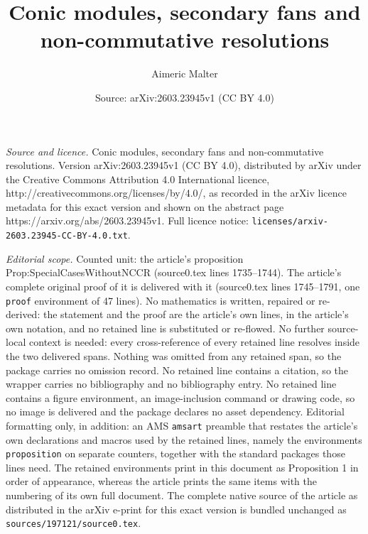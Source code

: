 \documentclass[10pt,a4paper]{amsart}
\title{Conic modules, secondary fans and non-commutative resolutions}
\author{Aimeric Malter}
\date{Source: arXiv:2603.23945v1 (CC BY 4.0)}
\begin{document}
\maketitle

\noindent\emph{Source and licence.} Conic modules, secondary fans and non-commutative resolutions. Version arXiv:2603.23945v1 (CC BY 4.0), distributed by arXiv under the Creative Commons Attribution 4.0 International licence, http://creativecommons.org/licenses/by/4.0/, as recorded in the arXiv licence metadata for this exact version and shown on the abstract page https://arxiv.org/abs/2603.23945v1. Full licence notice: \texttt{licenses/arxiv-2603.23945-CC-BY-4.0.txt}.\par\smallskip

\noindent\textit{Editorial scope.} Counted unit: the article's proposition Prop:SpecialCasesWithoutNCCR (source0.tex lines 1735--1744). The article's complete original proof of it is delivered with it (source0.tex lines 1745--1791, one \texttt{proof} environment of 47 lines). No mathematics is written, repaired or re-derived: the statement and the proof are the article's own lines, in the article's own notation, and no retained line is substituted or re-flowed.  No further source-local context is needed: every cross-reference of every retained line resolves inside the two delivered spans.  Nothing was omitted from any retained span, so the package carries no omission record.  No retained line contains a citation, so the wrapper carries no bibliography and no bibliography entry.  No retained line contains a figure environment, an image-inclusion command or drawing code, so no image is delivered and the package declares no asset dependency.  Editorial formatting only, in addition: an AMS \texttt{amsart} preamble that restates the article's own declarations and macros used by the retained lines, namely the environments \texttt{proposition} on separate counters, together with the standard packages those lines need.  The retained environments print in this document as Proposition 1 in order of appearance, whereas the article prints the same items with the numbering of its own full document.  The complete native source of the article as distributed in the arXiv e-print for this exact version is bundled unchanged as \texttt{sources/197121/source0.tex}.
\end{document}
